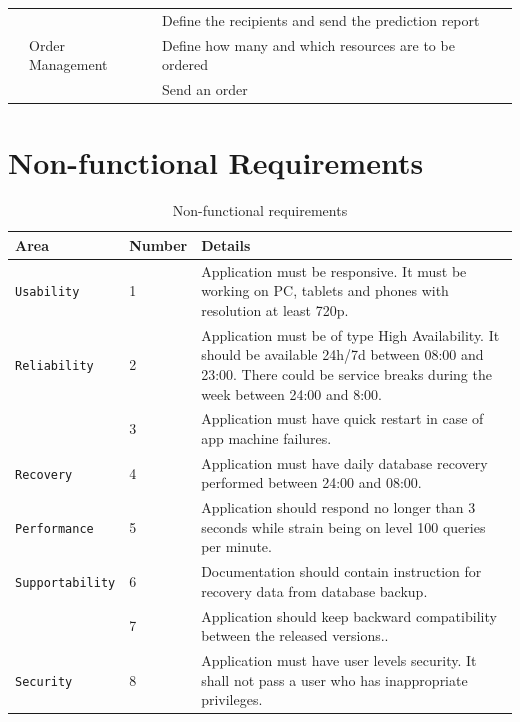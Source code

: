 \documentclass[a4paper,11pt,twoside]{report}
\theoremstyle{definition}
\begin{document}
\begin{longtable}{|p{3cm}|p{3cm}|p{10cm}|}
\texttt{} &  & Define the recipients and send the prediction report \\ \cline{2-3}

\texttt{} & Order Management & Define how many and which resources are to be ordered\\ \cline{3-3}
\texttt{} & & Send an order\\ \hline

\end{longtable}

\section{Non-functional Requirements}

\begin{table}[!h]%
\caption[Non-functional Requirements]{Non-functional requirements}
\label{requirements}
\centering
\begin{tabular}{|p{3cm}|p{2cm}|p{11cm}|}
\hline
Area & Number & Details \\ \hline
\texttt{Usability} & 1 & Application must be responsive. It must be working on PC, tablets and phones with resolution at least 720p.\\  \hline
\texttt{Reliability} & 2 & Application must be of type High Availability. It should be available 24h/7d between 08:00 and 23:00. There could be service breaks during the week between 24:00 and 8:00. \\  \cline{2-3}
\texttt{} & 3 & Application must have quick restart in case of app machine failures. \\ \hline
\texttt{Recovery} & 4 & Application must have daily database recovery performed between 24:00 and 08:00. \\ \hline
\texttt{Performance} & 5 & Application should respond no longer than 3 seconds while strain being on level 100 queries per minute. \\ \hline
\texttt{Supportability} & 6 & Documentation should contain instruction for recovery data from database backup.  \\ \cline{2-3}
\texttt{} & 7 & Application should keep backward compatibility between the released versions.. \\ \hline
\texttt{Security} & 8 & Application must have user levels security. It shall not pass a user who has inappropriate privileges. \\ \hline


\end{tabular}
\end{table}
\end{document}
